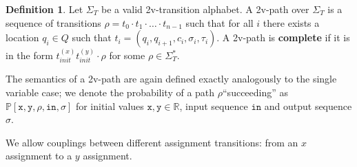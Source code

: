 \documentclass[12pt]{article}
\newcommand{\RR}{\mathbb{R}}
\newcommand{\PP}{\mathbb{P}}
\theoremstyle{definition}
\newtheorem{defn}[thm]{Definition}
\begin{document}
\begin{defn}
    Let $\Sigma_T$ be a valid 2v-transition alphabet. A 2v-path over $\Sigma_T$ is a sequence of transitions $\rho=t_0\cdot t_1\cdot \ldots \cdot t_{n-1}$ such that for all $i$ there exists a location $q_i\in Q$ such that $t_i = (q_i, q_{i+1}, c_i, \sigma_i, \tau_i)$. A 2v-path is \textbf{complete} if it is in the form $t_{init}^{(x)}t_{init}^{(y)}\cdot \rho$ for some $\rho\in \Sigma_T^*$.
\end{defn}

The semantics of a 2v-path are again defined exactly analogously to the single variable case; we denote the probability of a path $\rho$``succeeding'' as $\PP[\texttt{x}, \texttt{y}, \rho, \texttt{in}, \sigma]$ for initial values $\texttt{x}, \texttt{y}\in \RR$, input sequence $\texttt{in}$ and output sequence $\sigma$. 

We allow couplings between different assignment transitions: from an $x$ assignment to a $y$ assignment. 
\end{document}
